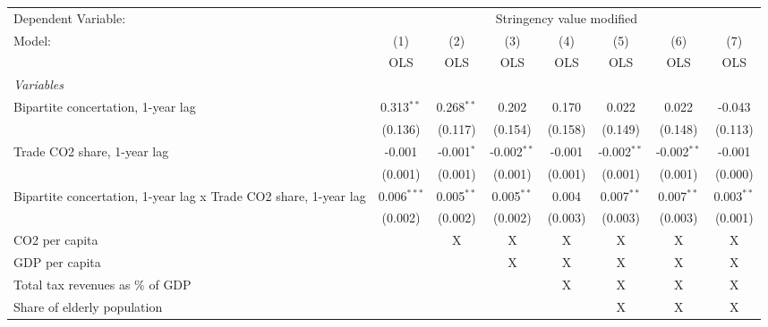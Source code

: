 
\begingroup
\centering
\begin{tabular}{lccccccc}
   \toprule
   Dependent Variable: & \multicolumn{7}{c}{Stringency value modified}\\
   Model:                                                           & (1)           & (2)          & (3)           & (4)     & (5)           & (6)           & (7)\\  
                                                                    &  OLS          & OLS          & OLS           & OLS     & OLS           & OLS           & OLS\\  
   \midrule
   \emph{Variables}\\
   Bipartite concertation, 1-year lag                               & 0.313$^{**}$  & 0.268$^{**}$ & 0.202         & 0.170   & 0.022         & 0.022         & -0.043\\   
                                                                    & (0.136)       & (0.117)      & (0.154)       & (0.158) & (0.149)       & (0.148)       & (0.113)\\   
   Trade CO2 share, 1-year lag                                      & -0.001        & -0.001$^{*}$ & -0.002$^{**}$ & -0.001  & -0.002$^{**}$ & -0.002$^{**}$ & -0.001\\   
                                                                    & (0.001)       & (0.001)      & (0.001)       & (0.001) & (0.001)       & (0.001)       & (0.000)\\   
   Bipartite concertation, 1-year lag x Trade CO2 share, 1-year lag & 0.006$^{***}$ & 0.005$^{**}$ & 0.005$^{**}$  & 0.004   & 0.007$^{**}$  & 0.007$^{**}$  & 0.003$^{**}$\\   
                                                                    & (0.002)       & (0.002)      & (0.002)       & (0.003) & (0.003)       & (0.003)       & (0.001)\\   
   CO2 per capita                                                   &               & X            & X             & X       & X             & X             & X\\  
   GDP per capita                                                   &               &              & X             & X       & X             & X             & X\\  
   Total tax revenues as \% of GDP                                  &               &              &               & X       & X             & X             & X\\  
   Share of elderly population                                      &               &              &               &         & X             & X             & X\\  

\end{tabular}
